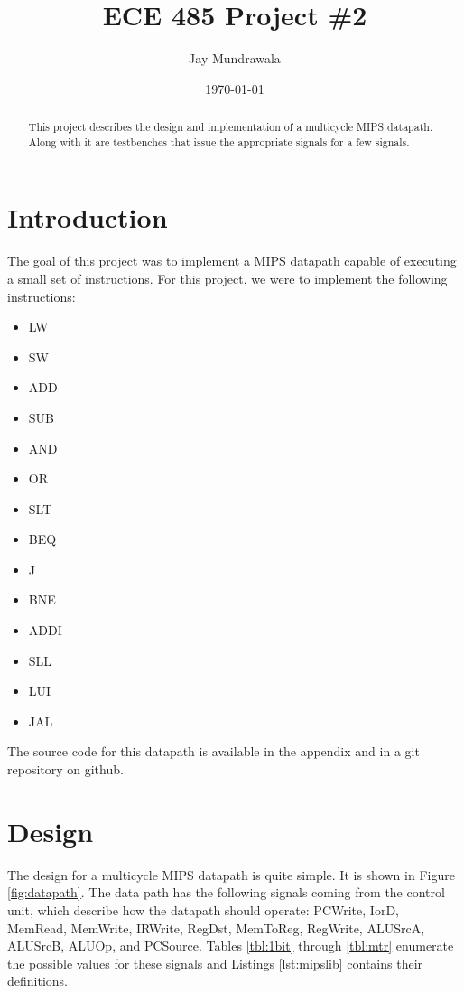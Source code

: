 \documentclass[12pt, a4paper]{article}
\begin{document}
\title{ECE 485 Project \#2}
\author{Jay Mundrawala}
\date{\today}
\maketitle

\begin{abstract}
  This project describes the design and implementation of a multicycle MIPS datapath. Along with it are
  testbenches that issue the appropriate signals for a few signals.
\end{abstract}

\section{Introduction}
The goal of this project was to implement a MIPS datapath capable of executing a small set of instructions.
For this project, we were to implement the following instructions:
\begin{itemize}
  \item LW
  \item SW
  \item ADD
  \item SUB
  \item AND
  \item OR
  \item SLT
  \item BEQ
  \item J
  \item BNE
  \item ADDI
  \item SLL
  \item LUI
  \item JAL
\end{itemize}
The source code for this datapath is available in the appendix and in a git repository on github.
\section{Design}
The design for a multicycle MIPS datapath is quite simple. It is shown in Figure \ref{fig:datapath}.
The data path has the following signals
coming from the control unit, which describe how the datapath should operate: PCWrite, IorD, MemRead,
MemWrite, IRWrite, RegDst, MemToReg, RegWrite, ALUSrcA, ALUSrcB, ALUOp, and PCSource. Tables \ref{tbl:1bit} through
\ref{tbl:mtr} enumerate the possible values for these signals and Listings \ref{lst:mipslib} contains their
definitions.
\end{document}
